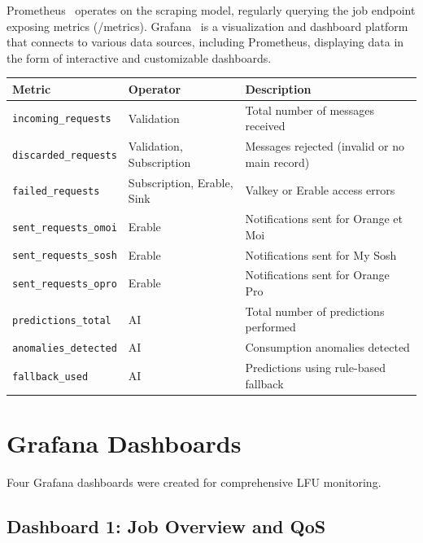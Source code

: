 Prometheus~\cite{prometheus} operates on the scraping model, regularly querying the job endpoint exposing metrics (/metrics). Grafana~\cite{grafana} is a visualization and dashboard platform that connects to various data sources, including Prometheus, displaying data in the form of interactive and customizable dashboards.

\begin{center}
    \begin{tabularx}{\textwidth}{|l|l|X|}
\toprule
\textbf{Metric} & \textbf{Operator} & \textbf{Description} \\
\midrule
\texttt{incoming\_requests} & Validation & Total number of messages received \\ \hline
\texttt{discarded\_requests} & Validation, Subscription & Messages rejected (invalid or no main record) \\ \hline
\texttt{failed\_requests} & Subscription, Erable, Sink & Valkey or Erable access errors \\ \hline
\texttt{sent\_requests\_omoi} & Erable & Notifications sent for Orange et Moi \\ \hline
\texttt{sent\_requests\_sosh} & Erable & Notifications sent for My Sosh \\ \hline
\texttt{sent\_requests\_opro} & Erable & Notifications sent for Orange Pro \\ \hline
\texttt{predictions\_total} & AI & Total number of predictions performed \\ \hline
\texttt{anomalies\_detected} & AI & Consumption anomalies detected \\ \hline
\texttt{fallback\_used} & AI & Predictions using rule-based fallback \\
\bottomrule
    \end{tabularx}
    \label{tab:runtime-metrics}
\end{center}

\section{Grafana Dashboards}

Four Grafana dashboards were created for comprehensive LFU monitoring.

\subsection{Dashboard 1: Job Overview and QoS}


